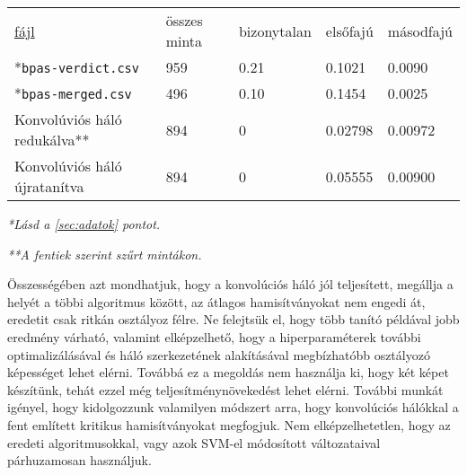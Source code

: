 \begin{tabular}{ l l l l l }
	\underline{fájl} 			& összes minta 	& bizonytalan	& elsőfajú	& másodfajú \\
	*\texttt{bpas-verdict.csv} 	& 959 			& 0.21			& 0.1021 	& 0.0090 	\\
	*\texttt{bpas-merged.csv} 	& 496			& 0.10			& 0.1454 	& 0.0025   \\
	
	\hline
	Konvolúviós háló redukálva**& 894			& 0				& 0.02798	& 0.00972	\\
	Konvolúviós háló újratanítva& 894			& 0				& 0.05555	& 0.00900	\\
	
\end{tabular} \mbox{}


\textit{*Lásd a \ref{sec:adatok} pontot.}

\textit{**A fentiek szerint szűrt mintákon.}


Összességében azt mondhatjuk, hogy a konvolúciós háló jól teljesített, megállja a helyét 
a többi algoritmus között, az átlagos hamisítványokat nem engedi át, eredetit csak ritkán 
osztályoz félre. Ne felejtsük el, hogy több tanító példával jobb eredmény várható,
valamint elképzelhető, hogy a hiperparaméterek további optimalizálásával és háló 
szerkezetének alakításával megbízhatóbb osztályozó képességet lehet elérni. 
Továbbá ez a megoldás nem használja ki, hogy két képet készítünk, tehát ezzel még 
teljesítménynövekedést lehet elérni. További munkát igényel, hogy kidolgozzunk valamilyen
módszert arra, hogy konvolúciós hálókkal a fent említett kritikus hamisítványokat megfogjuk.
Nem elképzelhetetlen, hogy az eredeti algoritmusokkal, vagy azok SVM-el módosított változataival
párhuzamosan használjuk.




%
%
%
%
%
%
%
%










